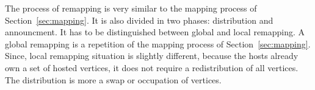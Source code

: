 The process of remapping is very similar to the mapping process of
Section~\ref{sec:mapping}.  It is also divided in two phases:
distribution and announcment. It has to be distinguished between
global and local remapping. A global remapping is a repetition of the
mapping process of Section~\ref{sec:mapping}.  Since, local remapping
situation is slightly different, because the hosts already own a set
of hosted vertices, it does not require a redistribution of all
vertices.  The distribution is more a swap or occupation of vertices.


\cleardoublepage

